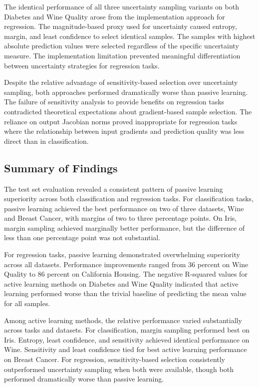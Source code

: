 \documentclass[conference]{IEEEtran}
\begin{document}
The identical performance of all three uncertainty sampling variants on both Diabetes and Wine Quality arose from the implementation approach for regression. The magnitude-based proxy used for uncertainty caused entropy, margin, and least confidence to select identical samples. The samples with highest absolute prediction values were selected regardless of the specific uncertainty measure. The implementation limitation prevented meaningful differentiation between uncertainty strategies for regression tasks.

Despite the relative advantage of sensitivity-based selection over uncertainty sampling, both approaches performed dramatically worse than passive learning. The failure of sensitivity analysis to provide benefits on regression tasks contradicted theoretical expectations about gradient-based sample selection. The reliance on output Jacobian norms proved inappropriate for regression tasks where the relationship between input gradients and prediction quality was less direct than in classification.

\subsection{Summary of Findings}

The test set evaluation revealed a consistent pattern of passive learning superiority across both classification and regression tasks. For classification tasks, passive learning achieved the best performance on two of three datasets, Wine and Breast Cancer, with margins of two to three percentage points. On Iris, margin sampling achieved marginally better performance, but the difference of less than one percentage point was not substantial.

For regression tasks, passive learning demonstrated overwhelming superiority across all datasets. Performance improvements ranged from 36 percent on Wine Quality to 86 percent on California Housing. The negative R-squared values for active learning methods on Diabetes and Wine Quality indicated that active learning performed worse than the trivial baseline of predicting the mean value for all samples.

Among active learning methods, the relative performance varied substantially across tasks and datasets. For classification, margin sampling performed best on Iris. Entropy, least confidence, and sensitivity achieved identical performance on Wine. Sensitivity and least confidence tied for best active learning performance on Breast Cancer. For regression, sensitivity-based selection consistently outperformed uncertainty sampling when both were available, though both performed dramatically worse than passive learning.
\end{document}
